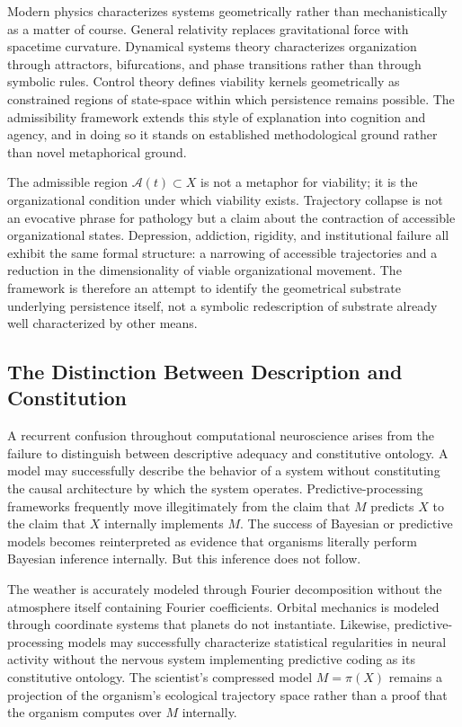 \documentclass[12pt,a4paper]{report}
\theoremstyle{flyxion}
\begin{document}
Modern physics characterizes systems geometrically rather than mechanistically as a matter of course. General relativity replaces gravitational force with spacetime curvature. Dynamical systems theory characterizes organization through attractors, bifurcations, and phase transitions rather than through symbolic rules. Control theory defines viability kernels geometrically as constrained regions of state-space within which persistence remains possible. The admissibility framework extends this style of explanation into cognition and agency, and in doing so it stands on established methodological ground rather than novel metaphorical ground.

The admissible region $\mathcal{A}(t) \subset X$ is not a metaphor for viability; it is the organizational condition under which viability exists. Trajectory collapse is not an evocative phrase for pathology but a claim about the contraction of accessible organizational states. Depression, addiction, rigidity, and institutional failure all exhibit the same formal structure: a narrowing of accessible trajectories and a reduction in the dimensionality of viable organizational movement. The framework is therefore an attempt to identify the geometrical substrate underlying persistence itself, not a symbolic redescription of substrate already well characterized by other means.

\subsection*{The Distinction Between Description and Constitution}

A recurrent confusion throughout computational neuroscience arises from the failure to distinguish between descriptive adequacy and constitutive ontology. A model may successfully describe the behavior of a system without constituting the causal architecture by which the system operates. Predictive-processing frameworks frequently move illegitimately from the claim that $M$ predicts $X$ to the claim that $X$ internally implements $M$. The success of Bayesian or predictive models becomes reinterpreted as evidence that organisms literally perform Bayesian inference internally. But this inference does not follow.

The weather is accurately modeled through Fourier decomposition without the atmosphere itself containing Fourier coefficients. Orbital mechanics is modeled through coordinate systems that planets do not instantiate. Likewise, predictive-processing models may successfully characterize statistical regularities in neural activity without the nervous system implementing predictive coding as its constitutive ontology. The scientist's compressed model $M = \pi(X)$ remains a projection of the organism's ecological trajectory space rather than a proof that the organism computes over $M$ internally.
\end{document}
